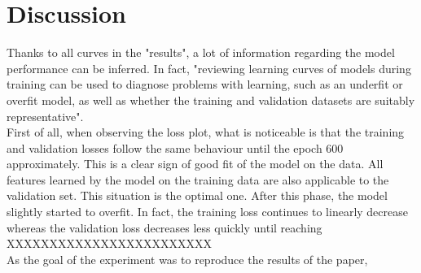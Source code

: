 \section{Discussion}
Thanks to all curves in the "results", a lot of information regarding the model performance can be inferred. In fact, "reviewing learning curves of models during training can be used to diagnose problems with learning, such as an underfit or overfit model, as well as whether the training and validation datasets are suitably representative"\cite{40}.\\
First of all, when observing the loss plot, what is noticeable is that the training and validation losses follow the same behaviour until the epoch 600 approximately. This is a clear sign of good fit of the model on the data. All features learned by the model on the training data are also applicable to the validation set. This situation is the optimal one. After this phase, the model slightly started to overfit. In fact, the training loss continues to linearly decrease whereas the validation loss decreases less quickly until reaching  XXXXXXXXXXXXXXXXXXXXXXXX\\

As the goal of the experiment was to reproduce the results of the paper, 

